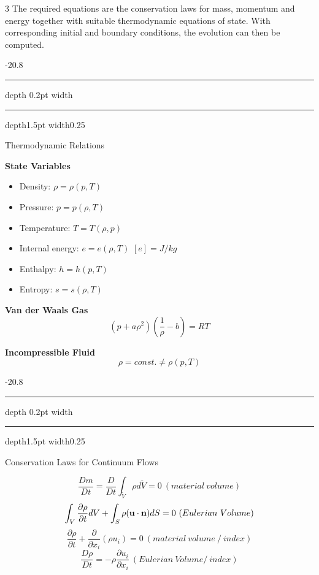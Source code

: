 \documentclass[8pt, landscape, fleqn]{scrartcl}
\makeatletter
\renewcommand{\section}{\@startsection{section}{1}{0mm}%
{-2\baselineskip}{0.8\baselineskip}%
{\hrule depth 0.2pt width\columnwidth\hrule depth1.5pt
width0.25\columnwidth\vspace*{1.2em}\Large\bfseries\rmfamily}}
\makeatother
\begin{document}
\begin{multicols*}{3}
The required equations are the conservation laws for mass, momentum and energy together with suitable thermodynamic equations of state. With corresponding initial and boundary conditions, the evolution can then be computed.

\section{Thermodynamic Relations}

\textbf{State Variables}

\begin{itemize}
    \item Density: $\rho = \rho(p,T)$
    \item Pressure: $p = p(\rho,T)$
    \item Temperature: $T = T(\rho, p)$
    \item Internal energy: $e = e(\rho, T)$ $[e] = J/kg$
    \item Enthalpy: $h = h(p,T)$
    \item Entropy: $s = s(\rho, T)$
\end{itemize}

\textbf{Van der Waals Gas}
\begin{equation*}
    (p+a\rho^2)\left(\frac{1}{\rho}-b\right) = RT
\end{equation*}


\textbf{Incompressible Fluid}
\begin{equation*}
    \rho = const. \neq \rho(p,T)
\end{equation*}

\section{Conservation Laws for Continuum Flows}

\begin{equation*}
	\frac{Dm}{Dt} = \frac{D}{Dt}\int_{\tilde V} \rho d\tilde V = 0 ~(material~ volume)
\end{equation*}
\begin{equation*}
	\int_V \frac{\partial \rho}{\partial t} dV + \int_S \rho(\bold{u}\cdot \bold{n}) dS = 0~(Eulerian~Volume)
\end{equation*}
\begin{equation*}
	\frac{\partial \rho}{\partial t} + \frac{\partial}{\partial x_i}(\rho u_i) = 0~(material~volume~/~index)
\end{equation*}
\begin{equation*}
	\frac{D\rho}{Dt} = -\rho \frac{\partial u_i}{\partial x_i}~(Eulerian~Volume / ~index)
\end{equation*}


\end{multicols*}
\end{document}
